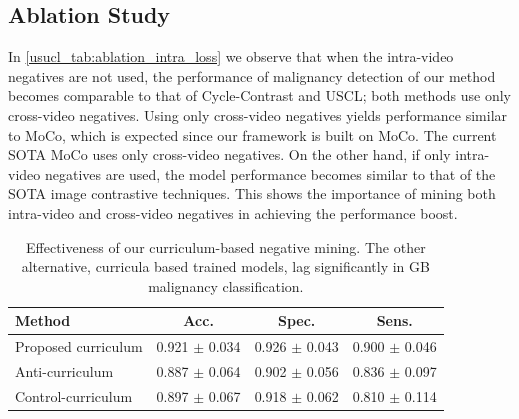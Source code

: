 \subsection{Ablation Study}
%
In \cref{usucl_tab:ablation_intra_loss} we observe that when the intra-video negatives are not used, the performance of malignancy detection of our method becomes comparable to that of Cycle-Contrast and USCL; both methods use only cross-video negatives. Using only cross-video negatives yields performance similar to MoCo, which is expected since our framework is built on MoCo. The current SOTA MoCo uses only cross-video negatives. On the other hand, if only intra-video negatives are used, the model performance becomes similar to that of the SOTA image contrastive techniques. This shows the importance of mining both intra-video and cross-video negatives in achieving the performance boost.


\begin{table}[t]
	\centering
    \footnotesize
	\setlength{\tabcolsep}{10pt}
	\begin{tabular}{lccc}
		\toprule
		\textbf{Method}	& \textbf{Acc.} & \textbf{Spec.} & \textbf{Sens.} \\
		\midrule
		Proposed curriculum & 0.921 $\pm$ 0.034 & 0.926 $\pm$ 0.043 & 0.900 $\pm$ 0.046 \\
		Anti-curriculum & 0.887 $\pm$ 0.064 & 0.902 $\pm$ 0.056 & 0.836 $\pm$ 0.097 \\
		Control-curriculum & 0.897 $\pm$ 0.067 & 0.918 $\pm$ 0.062 & 0.810 $\pm$ 0.114 \\
		\bottomrule
	\end{tabular}
    \caption[Effectiveness of the curriculum-based negative mining]{Effectiveness of our curriculum-based negative mining. The other alternative, curricula based trained models, lag significantly in GB malignancy classification.}
	\label{usucl_tab:ablation_curriculum}
\end{table}


